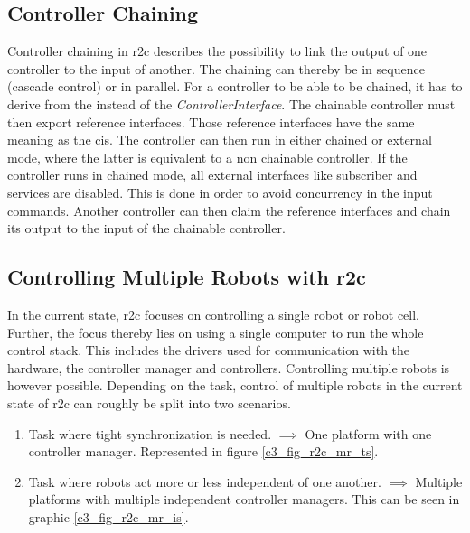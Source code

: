 \subsection{Controller Chaining}
Controller chaining in \gls{r2c} describes the possibility to link the output of one controller to the input of another. The chaining can thereby be in sequence (cascade control) or in parallel.\newline
For a controller to be able to be chained, it has to derive from the \textit{} instead of the \textit{ControllerInterface}. The chainable controller must then export reference interfaces. Those reference interfaces have the same meaning as the \glspl{ci}. The controller can then run in either chained or external mode, where the latter is equivalent to a non chainable controller. If the controller runs in chained mode, all external interfaces like subscriber and services are disabled. This is done in order to avoid concurrency in the input commands. Another controller can then claim the reference interfaces and chain its output to the input of the chainable controller.

\subsection{Controlling Multiple Robots with \gls{r2c}}\label{c3_sec_controlling_multiple_robots}
In the current state, \gls{r2c} focuses on controlling a single robot or robot cell. Further, the focus thereby lies on using a single computer to run the whole control stack. This includes the drivers used for communication with the hardware, the controller manager and controllers.\newline
Controlling multiple robots is however possible. Depending on the task, control of multiple robots in the current state of \gls{r2c} can roughly be split into two scenarios.
\begin{enumerate}[start=1,label={\upshape \texttt{Scenario \arabic*:}}, wide = 0pt, leftmargin = 3em]
    \item Task where tight synchronization is needed. $\implies$ One platform with one controller manager. Represented in figure \ref{c3_fig_r2c_mr_ts}.
    \item Task where robots act more or less independent of one another. $\implies$ Multiple platforms with multiple independent controller managers. This can be seen in graphic \ref{c3_fig_r2c_mr_is}.
\end{enumerate}

